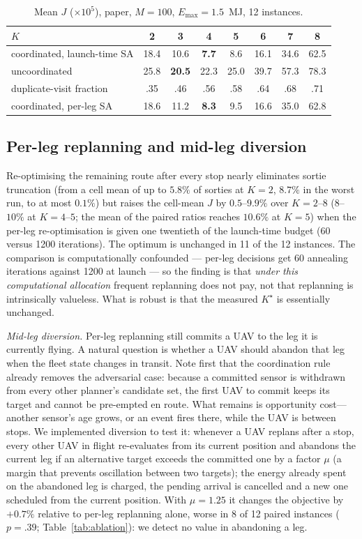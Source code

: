 \documentclass[journal,outdir=./]{IEEEtran}
\newcommand{\Emax}{E_{\max}}
\begin{document}
\begin{table}[t]\centering
\footnotesize\setlength{\tabcolsep}{3pt}
\caption{Mean $J$ ($\times10^{5}$), paper, $M=100$, $\Emax=1.5$~MJ, 12 instances.}
\label{tab:coord}
\begin{tabular}{lccccccc}
\toprule
$K$ & 2 & 3 & 4 & 5 & 6 & 7 & 8\\
\midrule
coordinated, launch-time SA & 18.4 & 10.6 & \textbf{7.7} & 8.6 & 16.1 & 34.6 & 62.5\\
uncoordinated & 25.8 & \textbf{20.5} & 22.3 & 25.0 & 39.7 & 57.3 & 78.3\\
duplicate-visit fraction & .35 & .46 & .56 & .58 & .64 & .68 & .71\\
coordinated, per-leg SA & 18.6 & 11.2 & \textbf{8.3} & 9.5 & 16.6 & 35.0 & 62.8\\
\bottomrule
\end{tabular}
\end{table}

\subsection{Per-leg replanning and mid-leg diversion}\label{sec:eval:replan}
Re-optimising the remaining route after every stop nearly eliminates sortie truncation (from a cell mean of up to $5.8\%$ of sorties at $K=2$, $8.7\%$ in the worst run, to at most $0.1\%$) but raises the cell-mean $J$ by $0.5$--$9.9\%$ over $K=2$--$8$ ($8$--$10\%$ at $K=4$--$5$; the mean of the paired ratios reaches $10.6\%$ at $K=5$) when the per-leg re-optimisation is given one twentieth of the launch-time budget (60 versus 1200 iterations). The optimum is unchanged in 11 of the 12 instances. The comparison is computationally confounded --- per-leg decisions get 60 annealing iterations against 1200 at launch --- so the finding is that \emph{under this computational allocation} frequent replanning does not pay, not that replanning is intrinsically valueless. What is robust is that the measured $K^{\star}$ is essentially unchanged.

\textit{Mid-leg diversion.} Per-leg replanning still commits a UAV to the leg it is currently flying. A natural question is whether a UAV should abandon that leg when the fleet state changes in transit. Note first that the coordination rule already removes the adversarial case: because a committed sensor is withdrawn from every other planner's candidate set, the first UAV to commit keeps its target and cannot be pre-empted en route. What remains is opportunity cost---another sensor's age grows, or an event fires there, while the UAV is between stops. We implemented diversion to test it: whenever a UAV replans after a stop, every other UAV in flight re-evaluates from its current position and abandons the current leg if an alternative target exceeds the committed one by a factor $\mu$ (a margin that prevents oscillation between two targets); the energy already spent on the abandoned leg is charged, the pending arrival is cancelled and a new one scheduled from the current position. With $\mu=1.25$ it changes the objective by $+0.7\%$ relative to per-leg replanning alone, worse in 8 of 12 paired instances ($p=.39$; Table~\ref{tab:ablation}): we detect no value in abandoning a leg.
\end{document}
